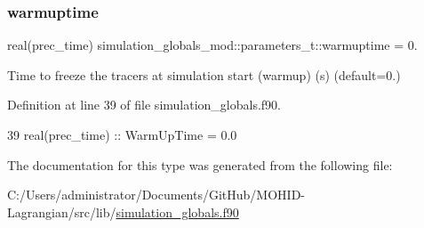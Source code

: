 \subsubsection{\texorpdfstring{warmuptime}{warmuptime}}
{\footnotesize\ttfamily real(prec\+\_\+time) simulation\+\_\+globals\+\_\+mod\+::parameters\+\_\+t\+::warmuptime = 0.\hspace{0.3cm}{\ttfamily [private]}}



Time to freeze the tracers at simulation start (warmup) (s) (default=0.) 



Definition at line 39 of file simulation\+\_\+globals.\+f90.


\begin{DoxyCode}
39         \textcolor{keywordtype}{real(prec\_time)} :: WarmUpTime = 0.0
\end{DoxyCode}


The documentation for this type was generated from the following file\+:\begin{DoxyCompactItemize}
\item 
C\+:/\+Users/administrator/\+Documents/\+Git\+Hub/\+M\+O\+H\+I\+D-\/\+Lagrangian/src/lib/\mbox{\hyperlink{simulation__globals_8f90}{simulation\+\_\+globals.\+f90}}\end{DoxyCompactItemize}
